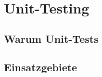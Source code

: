 %
%
\chapter{Unit-Testing}\label{ch:unittesting}
	\section{Warum Unit-Tests}\label{s:warumunittests}
	\section{Einsatzgebiete}\label{s:einsatzgebiete}
